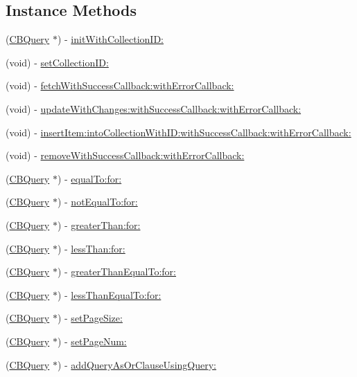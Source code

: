 \subsection*{Instance Methods}
\begin{DoxyCompactItemize}
\item 
(\hyperlink{interface_c_b_query}{C\+B\+Query} $\ast$) -\/ \hyperlink{interface_c_b_query_a945b8a169282151a97e6a0fd694cbb33}{init\+With\+Collection\+I\+D\+:}
\item 
(void) -\/ \hyperlink{interface_c_b_query_aa6df57d4b22629273cb22d39157ab234}{set\+Collection\+I\+D\+:}
\item 
(void) -\/ \hyperlink{interface_c_b_query_a2ff55cfdc8420ce06c3bfe334691a7cd}{fetch\+With\+Success\+Callback\+:with\+Error\+Callback\+:}
\item 
(void) -\/ \hyperlink{interface_c_b_query_aca3f69cedd6770da3fac14535b050d6c}{update\+With\+Changes\+:with\+Success\+Callback\+:with\+Error\+Callback\+:}
\item 
(void) -\/ \hyperlink{interface_c_b_query_a7c2529e9ef2e4c3630b01d8bff1ea25b}{insert\+Item\+:into\+Collection\+With\+I\+D\+:with\+Success\+Callback\+:with\+Error\+Callback\+:}
\item 
(void) -\/ \hyperlink{interface_c_b_query_acecf2b37deaf04803066830664b81ad1}{remove\+With\+Success\+Callback\+:with\+Error\+Callback\+:}
\item 
(\hyperlink{interface_c_b_query}{C\+B\+Query} $\ast$) -\/ \hyperlink{interface_c_b_query_a3ff649bb71392f2f21e210f07f0ef761}{equal\+To\+:for\+:}
\item 
(\hyperlink{interface_c_b_query}{C\+B\+Query} $\ast$) -\/ \hyperlink{interface_c_b_query_af7920062116379d99531b3443a8c3aa3}{not\+Equal\+To\+:for\+:}
\item 
(\hyperlink{interface_c_b_query}{C\+B\+Query} $\ast$) -\/ \hyperlink{interface_c_b_query_a26d58f8c51997aea862c26cc291d743e}{greater\+Than\+:for\+:}
\item 
(\hyperlink{interface_c_b_query}{C\+B\+Query} $\ast$) -\/ \hyperlink{interface_c_b_query_a29af545dcdf721cae1534c219a991021}{less\+Than\+:for\+:}
\item 
(\hyperlink{interface_c_b_query}{C\+B\+Query} $\ast$) -\/ \hyperlink{interface_c_b_query_a52b23279069fa19429ed6473ecf0eb73}{greater\+Than\+Equal\+To\+:for\+:}
\item 
(\hyperlink{interface_c_b_query}{C\+B\+Query} $\ast$) -\/ \hyperlink{interface_c_b_query_ac8007f263dbc069970ee76c90666b043}{less\+Than\+Equal\+To\+:for\+:}
\item 
(\hyperlink{interface_c_b_query}{C\+B\+Query} $\ast$) -\/ \hyperlink{interface_c_b_query_a5d7977f390caeb0eccb620ddf6e24c2f}{set\+Page\+Size\+:}
\item 
(\hyperlink{interface_c_b_query}{C\+B\+Query} $\ast$) -\/ \hyperlink{interface_c_b_query_a04a966e136634595b92597e8437ff176}{set\+Page\+Num\+:}
\item 
(\hyperlink{interface_c_b_query}{C\+B\+Query} $\ast$) -\/ \hyperlink{interface_c_b_query_abcb133d3ea6c27ccd85fc9d1278f7f41}{add\+Query\+As\+Or\+Clause\+Using\+Query\+:}
\end{DoxyCompactItemize}
